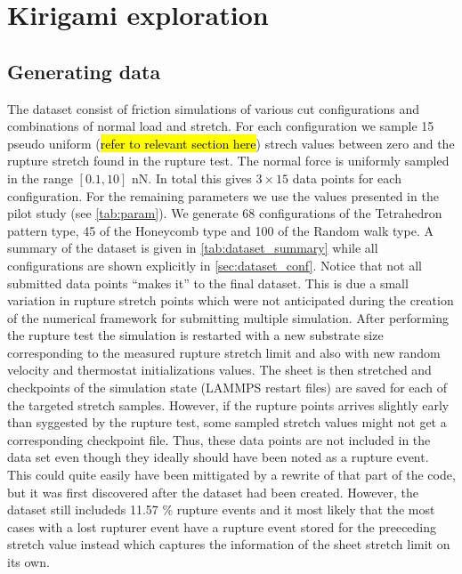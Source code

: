 \chapter{Kirigami exploration}

\section{Generating data}
The dataset consist of friction simulations of various cut configurations and combinations of normal load and stretch. For each configuration we
sample 15 pseudo uniform (\hl{refer to relevant section here}) strech values
between zero and the rupture stretch found in the rupture test. The normal force
is uniformly sampled in the range $[0.1, 10]$ nN. In total this gives $3\times
15$ data points for each configuration. For the remaining parameters we use the
values presented in the pilot study (see \cref{tab:param}). We generate 68
configurations of the Tetrahedron pattern type, 45 of the Honeycomb type and 100
of the Random walk type. A summary of the dataset is given in \cref{tab:dataset_summary} while all configurations are shown explicitly in \cref{sec:dataset_conf}. Notice that not all submitted data points ``makes it'' to the final dataset. This is due a small variation in rupture stretch points which were not anticipated during the creation of the numerical framework for submitting multiple simulation. After performing the rupture test the simulation is restarted
with a new substrate size corresponding to the measured rupture stretch limit
and also with new random velocity and thermostat initializations values. The sheet is then stretched and checkpoints of the simulation state (LAMMPS restart files) are saved for each of the targeted stretch samples. However, if the rupture points arrives slightly early than syggested by the rupture test, some sampled stretch values might not get a corresponding checkpoint file. Thus, these data points are not included in the data set even though they ideally should have been noted as a rupture event. This could quite easily have been mittigated by a rewrite of that part of the code, but it was first discovered after the dataset had been created. However, the dataset still includeds 11.57 \% rupture events and it most likely that the most cases with a lost rupturer event have a rupture event stored for the preeceding stretch value instead which captures the information of the sheet stretch limit on its own. 

